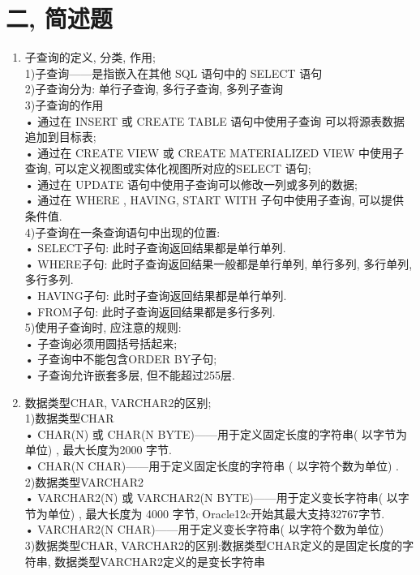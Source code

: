 \documentclass{article}                     %
\numberwithin{equation}{section}            %
\numberwithin{figure}{section}              %
\numberwithin{table}{section}               %
\begin{document}
\section{二, 简述题}
\begin{enumerate}
\item 子查询的定义, 分类, 作用; \\
1)子查询——是指嵌入在其他 SQL 语句中的 SELECT 语句\\
2)子查询分为: 单行子查询, 多行子查询, 多列子查询\\
3)子查询的作用\\
• 通过在 INSERT 或 CREATE TABLE 语句中使用子查询 可以将源表数据追加到目标表; \\
• 通过在 CREATE VIEW 或 CREATE MATERIALIZED VIEW 中使用子查询, 可以定义视图或实体化视图所对应的SELECT 语句; \\
• 通过在 UPDATE 语句中使用子查询可以修改一列或多列的数据; \\
• 通过在 WHERE , HAVING, START WITH 子句中使用子查询, 可以提供条件值. \\
4)子查询在一条查询语句中出现的位置: \\
• SELECT子句: 此时子查询返回结果都是单行单列. \\
• WHERE子句: 此时子查询返回结果一般都是单行单列, 单行多列, 多行单列, 多行多列. \\
• HAVING子句: 此时子查询返回结果都是单行单列. \\
• FROM子句: 此时子查询返回结果都是多行多列. \\
5)使用子查询时, 应注意的规则: \\
• 子查询必须用圆括号括起来; \\
• 子查询中不能包含ORDER BY子句; \\
• 子查询允许嵌套多层, 但不能超过255层. \\



\item 数据类型CHAR, VARCHAR2的区别; \\
1)数据类型CHAR\\
• CHAR(N) 或 CHAR(N BYTE)——用于定义固定长度的字符串( 以字节为单位) , 最大长度为2000 字节. \\
• CHAR(N CHAR)——用于定义固定长度的字符串 ( 以字符个数为单位) . \\
2)数据类型VARCHAR2\\
• VARCHAR2(N) 或 VARCHAR2(N BYTE)——用于定义变长字符串( 以字节为单位) , 最大长度为 4000 字节, Oracle12c开始其最大支持32767字节. \\
• VARCHAR2(N CHAR)——用于定义变长字符串( 以字符个数为单位) \\
3)数据类型CHAR, VARCHAR2的区别:数据类型CHAR定义的是固定长度的字符串, 数据类型VARCHAR2定义的是变长字符串\\




\end{enumerate}
\end{document}
